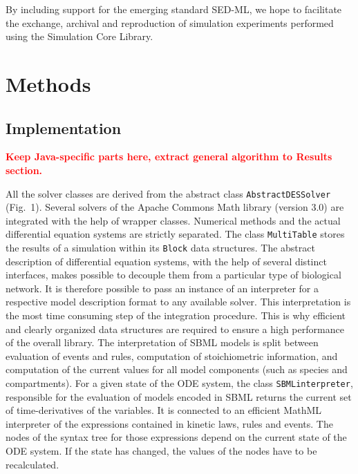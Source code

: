\documentclass[10pt]{bmc_article}
\newenvironment{bmcformat}{\baselineskip20pt\sloppy\setboolean{publ}{false}}{\baselineskip20pt\sloppy}
\newcommand{\TODO}[1]{\textcolor{red}{\textbf{#1}}}
\newcommand{\AbstractDESSolver}{\texttt{Abstract\-DES\-Solver}}
\newcommand{\SBMLinterpreter}{\texttt{SBML\-interpreter}}
\newcommand{\MultiTable}{\texttt{Multi\-Table}}
\newcommand{\Block}{\texttt{Block}}
\begin{document}
\begin{bmcformat}

By including support for the emerging standard SED-ML, we hope to facilitate the
exchange, archival and reproduction of simulation experiments performed using
the Simulation Core Library.

\section{Methods}

\subsection{Implementation}

\TODO{Keep Java-specific parts here, extract general algorithm to Results
section.}

All the solver classes are derived from the abstract class \AbstractDESSolver{}
(Fig.~1).
Several solvers of the Apache Commons Math library (version 3.0) are integrated
with the help of wrapper classes. Numerical methods and the actual differential
equation systems are strictly separated. The class \MultiTable{} stores the
results of a simulation within its \Block{} data structures. 
%
The abstract description of differential equation systems, with the help of
several distinct interfaces, makes possible to decouple them from a particular
type of biological network. It is therefore possible to pass an instance of an
interpreter for a respective model description format to any available solver.
%
This interpretation is the most time consuming step of the integration procedure.
This is why efficient and clearly organized data structures are required to
ensure a high performance of the overall library. The interpretation of SBML
models is split between evaluation of events and rules, computation of
stoichiometric information, and computation of the current values for all model
components (such as species and compartments).
%
For a given state of the ODE system, the class \SBMLinterpreter{}, responsible
for the evaluation of models encoded in SBML returns the current set of
time-derivatives of the variables.
It is connected to an efficient MathML interpreter of the expressions contained
in kinetic laws, rules and events. The nodes of the syntax tree for those
expressions depend on the current state of the ODE system. If the state has
changed, the values of the nodes have to be recalculated.


\end{bmcformat}
\end{document}
